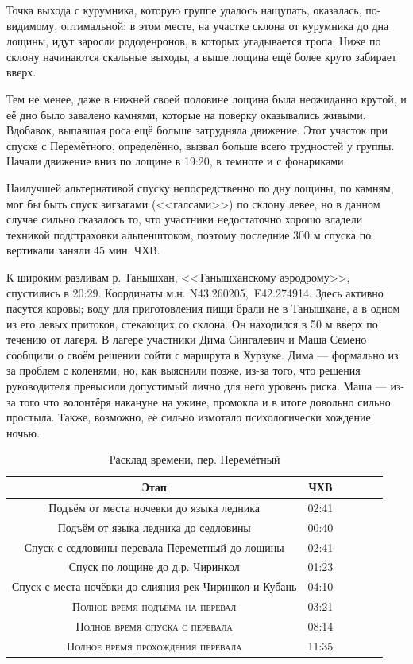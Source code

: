 Точка выхода с курумника, которую группе удалось нащупать, оказалась, по-видимому, оптимальной: в этом месте, на участке склона от курумника до дна лощины, идут заросли рододенронов, в которых угадывается тропа. Ниже по склону начинаются скальные выходы, а выше лощина ещё более круто забирает вверх. 

Тем не менее, даже в нижней своей половине лощина была неожиданно крутой, и её дно было завалено камнями, которые на поверку оказывались живыми. Вдобавок, выпавшая роса ещё больше затрудняла движение. Этот участок при спуске с Перемётного, определённо, вызвал больше всего трудностей у группы. Начали движение вниз по лощине в 19:20, в темноте и с фонариками.

Наилучшей альтернативой спуску непосредственно по дну лощины, по камням, мог бы быть спуск зигзагами (<<галсами>>) по склону левее, но в данном случае сильно сказалось то, что участники недостаточно хорошо владели техникой подстраховки альпенштоком, поэтому последние 300 м спуска по вертикали заняли 45 мин. ЧХВ. 

К широким разливам р. Танышхан, <<Танышханскому аэродрому>>, спустились в 20:29. Координаты м.н. N43.260205\degree,~E42.274914\degree. Здесь активно пасутся коровы; воду для приготовления пищи брали не в Танышхане, а в одном из его левых притоков, стекающих со склона. Он находился в 50 м вверх по течению от лагеря.
В лагере участники Дима Сингалевич и Маша Семено сообщили о своём решении сойти с маршрута в Хурзуке. Дима --- формально из за проблем с коленями, но, как выяснили позже, из-за того, что решения руководителя превысили допустимый лично для него уровень риска. Маша --- из-за того что волонтёря накануне на ужине, промокла и в итоге довольно сильно простыла. Также, возможно, её сильно измотало психологически хождение ночью.

\begin{table}[h!]
	\centering
	\begin{tabular}{|c|c|c|c|c|c|} 
		\hline 
		Этап & ЧХВ \\ 	
		\hline 
		Подъём от места ночевки до языка ледника  & 02:41 \\
		Подъём от языка ледника до седловины  & 00:40 \\
		Спуск с седловины перевала Переметный до лощины & 02:41\\ 
		Спуск по лощине до д.р. Чиринкол & 01:23\\ 
		Спуск с места ночёвки до слияния рек Чиринкол и Кубань & 04:10 \\
		
		\hline
		\textsc{Полное время подъёма на перевал  }& 03:21\\
		\textsc{Полное время спуска с перевала }& 08:14 \\
		\textsc{Полное время прохождения перевала }& 11:35 \\
		\hline
	\end{tabular}
	\caption{Расклад времени, пер. Перемётный}
\end{table}

